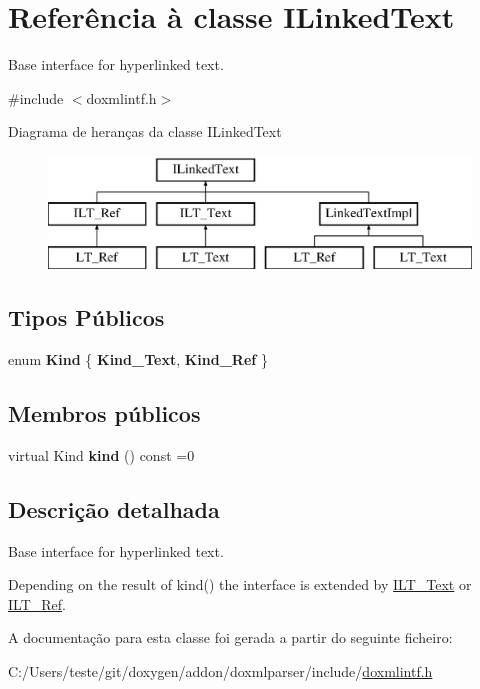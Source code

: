 \hypertarget{class_i_linked_text}{\section{Referência à classe I\-Linked\-Text}
\label{class_i_linked_text}
}


Base interface for hyperlinked text.  




{\ttfamily \#include $<$doxmlintf.\-h$>$}

Diagrama de heranças da classe I\-Linked\-Text\begin{figure}[H]
\begin{center}
\leavevmode
\includegraphics[height=3.000000cm]{class_i_linked_text}
\end{center}
\end{figure}
\subsection*{Tipos Públicos}
\begin{DoxyCompactItemize}
\item 
enum {\bfseries Kind} \{ {\bfseries Kind\-\_\-\-Text}, 
{\bfseries Kind\-\_\-\-Ref}
 \}
\end{DoxyCompactItemize}
\subsection*{Membros públicos}
\begin{DoxyCompactItemize}
\item 
\hypertarget{class_i_linked_text_a27e5d1dde6c9e861b52afa5a95f71d2d}{virtual Kind {\bfseries kind} () const =0}\label{class_i_linked_text_a27e5d1dde6c9e861b52afa5a95f71d2d}

\end{DoxyCompactItemize}


\subsection{Descrição detalhada}
Base interface for hyperlinked text. 

Depending on the result of kind() the interface is extended by \hyperlink{class_i_l_t___text}{I\-L\-T\-\_\-\-Text} or \hyperlink{class_i_l_t___ref}{I\-L\-T\-\_\-\-Ref}. 

A documentação para esta classe foi gerada a partir do seguinte ficheiro\-:\begin{DoxyCompactItemize}
\item 
C\-:/\-Users/teste/git/doxygen/addon/doxmlparser/include/\hyperlink{include_2doxmlintf_8h}{doxmlintf.\-h}\end{DoxyCompactItemize}
